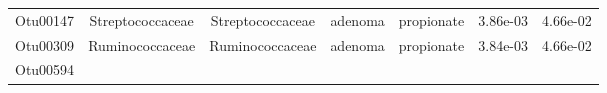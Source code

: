 \documentclass[11pt,]{article}
\begin{document}
\begin{longtable}[]{@{}ccccccc@{}}
\begin{minipage}[t]{0.09\columnwidth}\centering\strut
Otu00147\strut
\end{minipage} & \begin{minipage}[t]{0.17\columnwidth}\centering\strut
Streptococcaceae\strut
\end{minipage} & \begin{minipage}[t]{0.17\columnwidth}\centering\strut
Streptococcaceae\strut
\end{minipage} & \begin{minipage}[t]{0.09\columnwidth}\centering\strut
adenoma\strut
\end{minipage} & \begin{minipage}[t]{0.11\columnwidth}\centering\strut
propionate\strut
\end{minipage} & \begin{minipage}[t]{0.09\columnwidth}\centering\strut
3.86e-03\strut
\end{minipage} & \begin{minipage}[t]{0.09\columnwidth}\centering\strut
4.66e-02\strut
\end{minipage}\tabularnewline
\begin{minipage}[t]{0.09\columnwidth}\centering\strut
Otu00309\strut
\end{minipage} & \begin{minipage}[t]{0.17\columnwidth}\centering\strut
Ruminococcaceae\strut
\end{minipage} & \begin{minipage}[t]{0.17\columnwidth}\centering\strut
Ruminococcaceae\strut
\end{minipage} & \begin{minipage}[t]{0.09\columnwidth}\centering\strut
adenoma\strut
\end{minipage} & \begin{minipage}[t]{0.11\columnwidth}\centering\strut
propionate\strut
\end{minipage} & \begin{minipage}[t]{0.09\columnwidth}\centering\strut
3.84e-03\strut
\end{minipage} & \begin{minipage}[t]{0.09\columnwidth}\centering\strut
4.66e-02\strut
\end{minipage}\tabularnewline
\begin{minipage}[t]{0.09\columnwidth}\centering\strut
Otu00594\strut
\end{minipage} & \begin{minipage}[t]{0.17\columnwidth}\centering\strut

\end{minipage}
\end{longtable}
\end{document}
